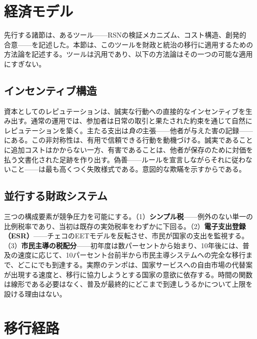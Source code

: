 \documentclass[11pt,a4paper,twocolumn]{article}
\begin{document}
\section{経済モデル}

先行する諸節は、あるツール——RSNの検証メカニズム、コスト構造、創発的合意——を記述した。本節は、このツールを財政と統治の移行に適用するための方法論を記述する。ツールは汎用であり、以下の方法論はその一つの可能な適用にすぎない。

\subsection{インセンティブ構造}

資本としてのレピュテーションは、誠実な行動への直接的なインセンティブを生み出す。通常の運用では、参加者は日常の取引と果たされた約束を通じて自然にレピュテーションを築く。主たる支出は\emph{負の}主張——他者が与えた害の記録——にある。この非対称性は、有用で信頼できる行動を動機づける。誠実であることに追加コストはかからない一方、有害であることは、他者が保存のために対価を払う文書化された足跡を作り出す。偽善——ルールを宣言しながらそれに従わないこと——は最も高くつく失敗様式である。意図的な欺瞞を示すからである。

\subsection{並行する財政システム}

三つの構成要素が競争圧力を可能にする。（1）\textbf{シンプル税}——例外のない単一の比例税率であり、当初は既存の実効税率をわずかに下回る。（2）\textbf{電子支出登録（ESR）}——チェコのEETモデルを反転させ、市民が国家の支出を監視する。（3）\textbf{市民主導の税配分}——初年度は数パーセントから始まり、10年後には、普及の速度に応じて、10パーセント台前半から市民主導システムへの完全な移行まで、どこにでも到達する。実際のテンポは、国家サービスへの自由市場の代替案が出現する速度と、移行に協力しようとする国家の意欲に依存する。時間の関数は線形である必要はなく、普及が最終的にどこまで到達しうるかについて上限を設ける理由はない。

\section{移行経路}
\end{document}
